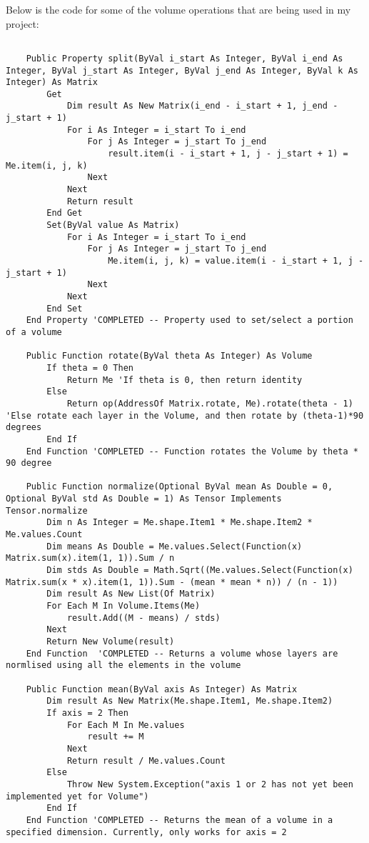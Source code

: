 Below is the code for some of the volume operations that are being used in my project: 
\begin{verbatim}

    Public Property split(ByVal i_start As Integer, ByVal i_end As Integer, ByVal j_start As Integer, ByVal j_end As Integer, ByVal k As Integer) As Matrix
        Get
            Dim result As New Matrix(i_end - i_start + 1, j_end - j_start + 1)
            For i As Integer = i_start To i_end
                For j As Integer = j_start To j_end
                    result.item(i - i_start + 1, j - j_start + 1) = Me.item(i, j, k)
                Next
            Next
            Return result
        End Get
        Set(ByVal value As Matrix)
            For i As Integer = i_start To i_end
                For j As Integer = j_start To j_end
                    Me.item(i, j, k) = value.item(i - i_start + 1, j - j_start + 1)
                Next
            Next
        End Set
    End Property 'COMPLETED -- Property used to set/select a portion of a volume
    
    Public Function rotate(ByVal theta As Integer) As Volume
        If theta = 0 Then
            Return Me 'If theta is 0, then return identity
        Else
            Return op(AddressOf Matrix.rotate, Me).rotate(theta - 1) 'Else rotate each layer in the Volume, and then rotate by (theta-1)*90 degrees
        End If
    End Function 'COMPLETED -- Function rotates the Volume by theta * 90 degree
    
    Public Function normalize(Optional ByVal mean As Double = 0, Optional ByVal std As Double = 1) As Tensor Implements Tensor.normalize
        Dim n As Integer = Me.shape.Item1 * Me.shape.Item2 * Me.values.Count
        Dim means As Double = Me.values.Select(Function(x) Matrix.sum(x).item(1, 1)).Sum / n
        Dim stds As Double = Math.Sqrt((Me.values.Select(Function(x) Matrix.sum(x * x).item(1, 1)).Sum - (mean * mean * n)) / (n - 1))
        Dim result As New List(Of Matrix)
        For Each M In Volume.Items(Me)
            result.Add((M - means) / stds)
        Next
        Return New Volume(result)
    End Function  'COMPLETED -- Returns a volume whose layers are normlised using all the elements in the volume
    
    Public Function mean(ByVal axis As Integer) As Matrix
        Dim result As New Matrix(Me.shape.Item1, Me.shape.Item2)
        If axis = 2 Then
            For Each M In Me.values
                result += M
            Next
            Return result / Me.values.Count
        Else
            Throw New System.Exception("axis 1 or 2 has not yet been implemented yet for Volume")
        End If
    End Function 'COMPLETED -- Returns the mean of a volume in a specified dimension. Currently, only works for axis = 2
    

\end{verbatim}
